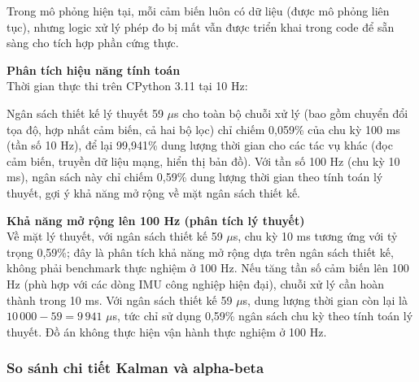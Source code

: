 Trong mô phỏng hiện tại, mỗi cảm biến luôn có dữ liệu (được mô phỏng liên tục), nhưng logic xử lý phép đo bị mất vẫn được triển khai trong code để sẵn sàng cho tích hợp phần cứng thực.

\textbf{Phân tích hiệu năng tính toán\\} Thời gian thực thi trên CPython 3.11 tại 10 Hz:

\begin{table}[H]
\centering
\caption{Ngân sách thời gian thiết kế lý thuyết mỗi bước lọc}
\label{tab:filter-timing}
\end{table}

Ngân sách thiết kế lý thuyết 59 $\mu$s cho toàn bộ chuỗi xử lý (bao gồm chuyển đổi tọa độ, hợp nhất cảm biến, cả hai bộ lọc) chỉ chiếm 0,059\% của chu kỳ 100 ms (tần số 10 Hz), để lại 99,941\% dung lượng thời gian cho các tác vụ khác (đọc cảm biến, truyền dữ liệu mạng, hiển thị bản đồ). Với tần số 100 Hz (chu kỳ 10 ms), ngân sách này chỉ chiếm 0,59\% dung lượng thời gian theo tính toán lý thuyết, gợi ý khả năng mở rộng về mặt ngân sách thiết kế.

\textbf{Khả năng mở rộng lên 100 Hz (phân tích lý thuyết)\\} Về mặt lý thuyết, với ngân sách thiết kế 59 $\mu$s, chu kỳ 10 ms tương ứng với tỷ trọng 0,59\%; đây là phân tích khả năng mở rộng dựa trên ngân sách thiết kế, không phải benchmark thực nghiệm ở 100 Hz. Nếu tăng tần số cảm biến lên 100 Hz (phù hợp với các dòng IMU công nghiệp hiện đại), chuỗi xử lý cần hoàn thành trong 10 ms. Với ngân sách thiết kế 59 $\mu$s, dung lượng thời gian còn lại là $10\,000 - 59 = 9\,941$ $\mu$s, tức chỉ sử dụng 0,59\% ngân sách chu kỳ theo tính toán lý thuyết. Đồ án không thực hiện vận hành thực nghiệm ở 100 Hz.

\subsubsection{So sánh chi tiết Kalman và alpha-beta}

